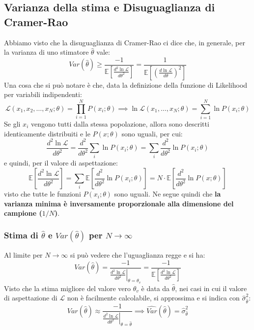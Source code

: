 \documentclass[openany,a4paper,12pt]{book}
\providecommand{\mathscr}[1]{\mathcal{#1}}
\theoremstyle{remark}
\begin{document}
\subsection{Varianza della stima e Disuguaglianza di Cramer-Rao}
Abbiamo visto che la disuguaglianza di Cramer-Rao ci dice che, in generale, per la varianza di uno stimatore $\hat{\theta}$ vale:
\begin{equation}
    Var(\hat{\theta}) \ge \frac{-1}{\mathbb{E}\left[ \frac{d^2 \ln \mathscr{L}}{d\theta^2} \right]} = \frac{1}{\mathbb{E}\left[ \left( \frac{d \ln \mathscr{L}}{d\theta} \right)^2 \right]}
    \label{eq:var_like}
\end{equation}
Una cosa che si può notare è che, data la definizione della funzione di Likelihood per variabili indipendenti:
\begin{equation}
    \mathscr{L}(x_1, x_2, \dots, x_N; \theta) = \prod_{i=1}^N P(x_i; \theta) \implies \ln \mathscr{L}(x_1, \dots, x_N; \theta) = \sum_{i=1}^N \ln P(x_i; \theta)
\end{equation}
Se gli $x_i$ vengono tutti dalla stessa popolazione, allora sono descritti identicamente distribuiti e le $P(x; \theta)$ sono uguali, per cui:
\begin{equation*}
    \frac{d^2 \ln \mathscr{L}}{d\theta^2} = \frac{d^2}{d\theta^2} \sum_i \ln P(x_i; \theta) = \sum_i \frac{d^2}{d\theta^2} \ln P(x_i; \theta)
\end{equation*}
e quindi, per il valore di aspettazione:
\begin{equation*}
    \mathbb{E}\left[ \frac{d^2 \ln \mathscr{L}}{d\theta^2} \right] = \sum_i \mathbb{E}\left[ \frac{d^2}{d\theta^2} \ln P(x_i; \theta) \right] = N \cdot \mathbb{E}\left[ \frac{d^2}{d\theta^2} \ln P(x; \theta) \right]
\end{equation*}
visto che tutte le funzioni $P(x_i; \theta)$ sono uguali. Ne segue quindi che \textbf{la varianza minima è inversamente proporzionale alla dimensione del campione ($1/N$)}.

\subsubsection*{Stima di \texorpdfstring{$\hat{\theta}$}{} e \texorpdfstring{$Var(\hat{\theta})$}{} per \texorpdfstring{$N \to \infty$}{}}
Al limite per $N \to \infty$ si può vedere che l'uguaglianza regge e si ha:
\begin{equation*}
    Var(\hat{\theta}) = \frac{-1}{\left. \frac{d^2 \ln \mathscr{L}}{d\theta^2} \right|_{\theta = \theta_v}} = \frac{-1}{\mathbb{E}\left[ \frac{d^2 \ln \mathscr{L}}{d\theta^2} \right]}
\end{equation*}
Visto che la stima migliore del valore vero $\theta_v$ è data da $\hat{\theta}$, nei casi in cui il valore di aspettazione di $\mathscr{L}$ non è facilmente calcolabile, si approssima e si indica con $\hat{\sigma}_{\hat{\theta}}^2$:
\begin{equation}
    Var(\hat{\theta}) \approx \frac{-1}{\left. \frac{d^2 \ln \mathscr{L}}{d\theta^2} \right|_{\theta = \hat{\theta}}} \implies \widehat{Var}(\hat{\theta}) = \hat{\sigma}_{\hat{\theta}}^2
\end{equation}
\end{document}
